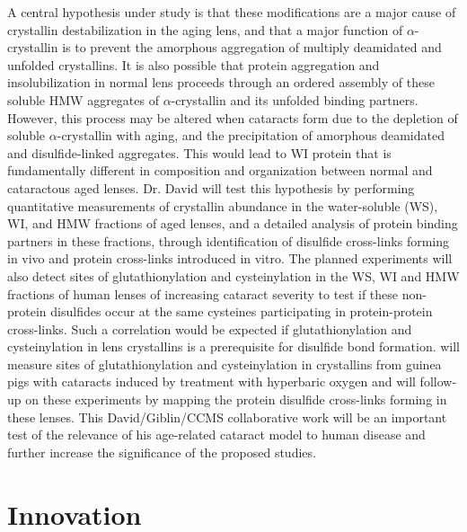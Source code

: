 \documentclass[arial,11pt]{article}
\begin{document}
A central hypothesis under study is that these modifications are a major cause of crystallin destabilization in the aging lens, and that a major function of $\alpha$-crystallin is to prevent the amorphous aggregation of multiply deamidated and unfolded crystallins.  It is also possible that protein aggregation and insolubilization in normal lens proceeds through an ordered assembly of these soluble HMW aggregates of $\alpha$-crystallin and its unfolded binding partners.  However, this process may be altered when cataracts form due to the depletion of soluble $\alpha$-crystallin with aging, and the precipitation of amorphous deamidated and disulfide-linked aggregates.  This would lead to WI protein that is fundamentally different in composition and organization between normal and cataractous aged lenses.  Dr. David will test this hypothesis by performing quantitative measurements of crystallin abundance in the water-soluble (WS), WI, and HMW fractions of aged lenses, and a detailed analysis of protein binding partners in these fractions, through identification of disulfide cross-links forming in vivo and protein cross-links introduced in vitro. %
%
The planned experiments will also detect sites of glutathionylation and cysteinylation in the WS, WI and HMW fractions of human lenses of increasing cataract severity to test if these non-protein disulfides occur at the same cysteines participating in protein-protein cross-links. Such a correlation would be expected if glutathionylation and cysteinylation in lens crystallins is a prerequisite for disulfide bond formation. 
will measure sites of glutathionylation and cysteinylation in crystallins from guinea pigs with cataracts induced by treatment with hyperbaric oxygen and will follow-up on these experiments by mapping the protein disulfide cross-links forming in these lenses.   This David/Giblin/CCMS collaborative work will be an important test of the relevance of his age-related cataract model to human disease and further increase the significance of the proposed studies.

\section{Innovation}
\end{document}
